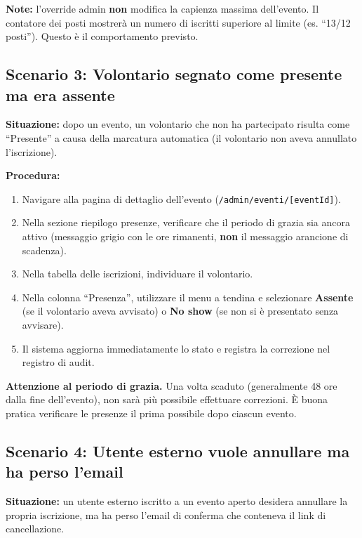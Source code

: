 \documentclass[a4paper,11pt,oneside]{book}
\newcommand{\percorso}[1]{\textcolor{namoCyan}{\texttt{#1}}}
\begin{document}
\textbf{Note:} l'override admin \textbf{non} modifica la capienza massima dell'evento. Il contatore dei posti mostrer\`a un numero di iscritti superiore al limite (es. ``13/12 posti''). Questo \`e il comportamento previsto.

\subsection{Scenario 3: Volontario segnato come presente ma era assente}

\textbf{Situazione:} dopo un evento, un volontario che non ha partecipato risulta come ``Presente'' a causa della marcatura automatica (il volontario non aveva annullato l'iscrizione).

\textbf{Procedura:}
\begin{enumerate}[leftmargin=1.5em]
  \item Navigare alla pagina di dettaglio dell'evento (\percorso{/admin/eventi/[eventId]}).
  \item Nella sezione riepilogo presenze, verificare che il periodo di grazia sia ancora attivo (messaggio grigio con le ore rimanenti, \textbf{non} il messaggio arancione di scadenza).
  \item Nella tabella delle iscrizioni, individuare il volontario.
  \item Nella colonna ``Presenza'', utilizzare il menu a tendina e selezionare \textbf{Assente} (se il volontario aveva avvisato) o \textbf{No show} (se non si \`e presentato senza avvisare).
  \item Il sistema aggiorna immediatamente lo stato e registra la correzione nel registro di audit.
\end{enumerate}

\begin{warningbox}
\textbf{Attenzione al periodo di grazia.} Una volta scaduto (generalmente 48 ore dalla fine dell'evento), non sar\`a pi\`u possibile effettuare correzioni. \`E buona pratica verificare le presenze il prima possibile dopo ciascun evento.
\end{warningbox}

\subsection{Scenario 4: Utente esterno vuole annullare ma ha perso l'email}

\textbf{Situazione:} un utente esterno iscritto a un evento aperto desidera annullare la propria iscrizione, ma ha perso l'email di conferma che conteneva il link di cancellazione.
\end{document}
